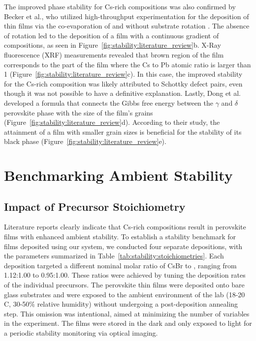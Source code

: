  The improved phase stability for Cs-rich compositions was also confirmed by Becker et al., who utilized high-throughput experimentation for the deposition of  thin films via the co-evaporation of  and  without substrate rotation \cite{Becker2019LowExperimentation}. The absence of rotation led to the deposition of a film with a continuous gradient of compositions, as seen in Figure~\ref{fig:stability:literature_review}b. X-Ray fluorescence (XRF) measurements revealed that brown region of the film corresponds to the part of the film where the Cs to Pb atomic ratio is larger than 1 (Figure~\ref{fig:stability:literature_review}c). In this case, the improved stability for the Cs-rich composition was likely attributed to Schottky defect pairs, even though it was not possible to have a definitive explanation. Lastly, Dong et al. developed a formula that connects the Gibbs free energy between the $\gamma$ and $\delta$ perovskite phase with the size of the film's grains (Figure~\ref{fig:stability:literature_review}d). According to their study, the attainment of a film with smaller grain sizes is beneficial for the stability of its black phase (Figure~\ref{fig:stability:literature_review}e).  

 

\section{Benchmarking Ambient Stability}

\subsection{Impact of Precursor Stoichiometry}

Literature reports clearly indicate that Cs-rich compositions result in perovskite films with enhanced ambient stability. To establish a stability benchmark for films deposited using our system, we conducted four separate depositions, with the parameters summarized in Table~\ref{tab:stability:stoichiometries}. Each deposition targeted a different nominal molar ratio of CsBr to , ranging from 1.12:1.00 to 0.95:1.00. These ratios were achieved by tuning the deposition rates of the individual precursors. The perovskite thin films were deposited onto bare glass substrates and were exposed to the ambient environment of the lab (18-20 \degree C, 30-50\% relative humidity) without undergoing a post-deposition annealing step. This omission was intentional, aimed at minimizing the number of variables in the experiment. The films were stored in the dark and only exposed to light for a periodic stability monitoring via optical imaging.


